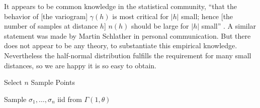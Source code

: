 It appears to be common knowledge in the statistical community, ``that the
behavior of [the variogram] \(\gamma(h)\) is most critical for \(|h|\) small;
hence [the number of samples at distance \(h\)] \(n(h)\) should be large for
\(|h|\) small'' \parencite{warrickOptimizationSamplingLocations1987}. A similar
statement was made by Martin Schlather in personal communication. But there
does not appear to be any theory, to substantiate this empirical knowledge.
Nevertheless the half-normal distribution fulfills the requirement for many
small distances, so we are happy it is so easy to obtain.

\begin{algorithm}
	\caption{Select \(n\) Sample Points}	
	Sample \(\sigma_1,\dots,\sigma_n\) iid from \(\Gamma(1,\theta)\)
\end{algorithm}

